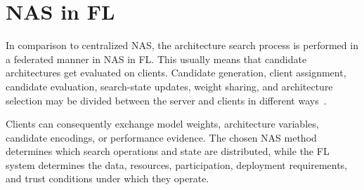 \section{NAS in FL}

In comparison to centralized NAS, the architecture search process is performed in a federated manner in NAS in FL. This usually means that candidate architectures get evaluated on clients. Candidate generation, client assignment, candidate evaluation, search-state updates, weight sharing, and architecture selection may be divided between the server and clients in different ways~\cite{nas_in_fl_2026}. 

Clients can consequently exchange model weights, architecture variables, candidate encodings, or performance evidence. The chosen NAS method determines which search operations and state are distributed, while the FL system determines the data, resources, participation, deployment requirements, and trust conditions under which they operate.
